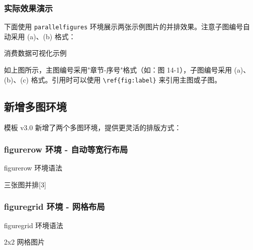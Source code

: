 \documentclass[linux]{hustreport}
\begin{document}
\subsubsection{实际效果演示}

下面使用 \texttt{parallelfigures} 环境展示两张示例图片的并排效果。注意子图编号自动采用 (a)、(b) 格式：

\begin{parallelfigures}{消费数据可视化示例}
\end{parallelfigures}

如上图所示，主图编号采用"章节-序号"格式（如：图 14-1），子图编号采用 (a)、(b)、(c) 格式。引用时可以使用 \verb|\ref{fig:label}| 来引用主图或子图。

\subsection{新增多图环境}

模板 v3.0 新增了两个多图环境，提供更灵活的排版方式：

\subsubsection{figurerow 环境 - 自动等宽行布局}

\begin{codeonly}{figurerow 环境语法}

\begin{figurerow}{三张图并排}[3]
\end{figurerow}
\end{codeonly}

\subsubsection{figuregrid 环境 - 网格布局}

\begin{codeonly}{figuregrid 环境语法}
\begin{figuregrid}{2x2 网格图片}
\end{figuregrid}
\end{codeonly}
\end{document}
